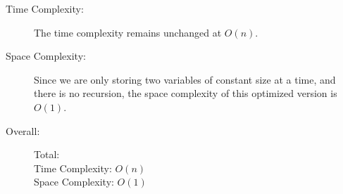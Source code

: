 \begin{description}
    \item[Time Complexity:]
        The time complexity remains unchanged at $O(n)$.

    \item[Space Complexity:] 
        Since we are only storing two variables of constant size at a time,
        and there is no recursion, the space complexity of this optimized version is $O(1)$.

    \item[Overall:] Total:\\
        Time Complexity: $O(n)$\\
        Space Complexity: $O(1)$
        
\end{description}


